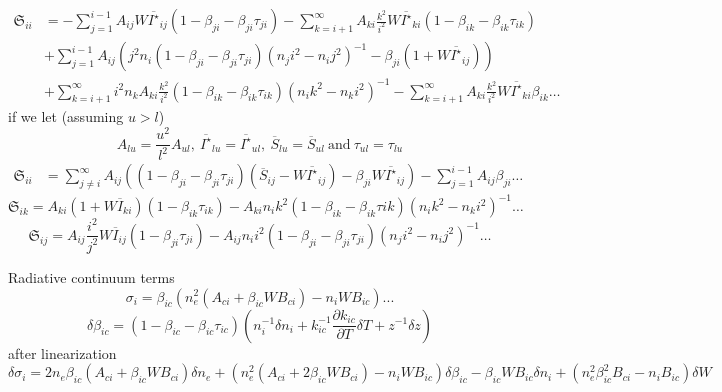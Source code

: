 \documentclass{article}
\begin{document}
\begin{equation}
    \begin{aligned}
        \mathfrak{S}_{ii} &= -\sum\limits_{j=1}^{i-1} A_{ij}W\overline{I^\star}_{ij}(1 - \beta_{ji} - \beta_{ji}\tau_{ji})-\sum\limits_{k=i+1}^\infty A_{ki}\frac{k^2}{i^2}W\overline{I^\star}_{ki}(1 - \beta_{ik} - \beta_{ik}\tau_{ik})\\
        &+\sum\limits_{j=1}^{i-1} A_{ij}\left(j^2n_i (1 - \beta_{ji} - \beta_{ji}\tau_{ji})(n_ji^2 - n_ij^2)^{-1} -\beta_{ji}(1+W\overline{I^\star}_{ij})\right)\\
        &+\sum\limits_{k=i+1}^\infty i^2n_kA_{ki}\frac{k^2}{i^2}(1 - \beta_{ik} - \beta_{ik}\tau_{ik})(n_ik^2 - n_ki^2)^{-1}-\sum\limits_{k=i+1}^\infty A_{ki}\frac{k^2}{i^2}W\overline{I^\star}_{ki}\beta_{ik}\dots
    \end{aligned}
\end{equation}
if we let (assuming \(u > l\))
\[
    A_{lu} = \frac{u^2}{l^2}A_{ul},\ \overline{I^\star}_{lu} = \overline{I^\star}_{ul},\ \overline{S}_{lu} = \overline{S}_{ul} \ \mathrm{and}\ \tau_{ul} = \tau_{lu}
\]
\begin{equation}
    \begin{aligned}
        \mathfrak{S}_{ii} &= \sum\limits_{j \neq i}^{\infty} A_{ij}\left((1 - \beta_{ji} - \beta_{ji}\tau_{ji})(\overline{S}_{ij} - W\overline{I^\star}_{ij}) -\beta_{ji}W\overline{I^\star}_{ij}\right) - \sum\limits_{j=1}^{i-1}A_{ij}\beta_{ji}\dots
    \end{aligned}
\end{equation}
\begin{equation}
    \mathfrak{S}_{ik} = A_{ki}(1 + W\overline{I}_{ki})(1 - \beta_{ik}\tau_{ik}) - A_{ki}n_ik^2(1 - \beta_{ik} - \beta_{ik}\tau{ik})(n_ik^2 - n_ki^2)^{-1}\dots
\end{equation}
\begin{equation}
    \mathfrak{S}_{ij} = A_{ij}\frac{i^2}{j^2}W\overline{I}_{ij}(1  - \beta_{ji}\tau_{ji}) - A_{ij}n_ii^2(1 - \beta_{ji} - \beta_{ji}\tau_{ji})(n_ji^2 - n_ij^2)^{-1}\dots
\end{equation}

Radiative continuum terms
\[
    \sigma_i = \beta_{ic}(n_e^2(A_{ci} + \beta_{ic}WB_{ci}) - n_iWB_{ic})...
\]
\[
    \delta \beta_{ic} = (1 - \beta_{ic} - \beta_{ic}\tau_{ic})\left(n_i^{-1}\delta n_i + k_{ic}^{-1}\frac{\partial k_{ic}}{\partial T}\delta T + z^{-1}\delta z\right)
\]
after linearization
\begin{equation}
    \delta\sigma_i = 2n_e\beta_{ic}(A_{ci} + \beta_{ic}WB_{ci})\delta n_e + (n_e^2(A_{ci} + 2\beta_{ic}WB_{ci}) - n_iWB_{ic})\delta\beta_{ic} - \beta_{ic}WB_{ic}\delta n_i + (n_e^2\beta_{ic}^2B_{ci} - n_iB_{ic})\delta W
\end{equation}
\end{document}
